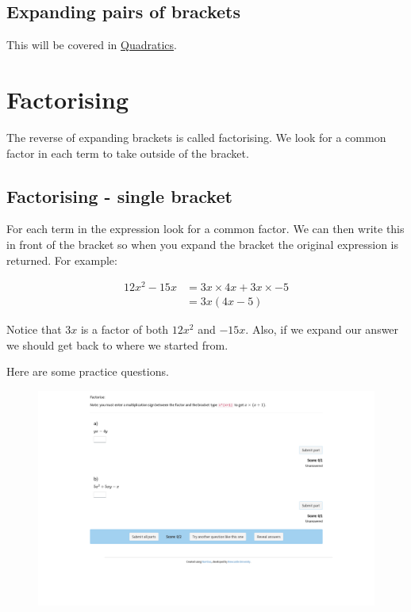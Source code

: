 \documentclass[
  a4paper,
]{scrbook}
\begin{document}
\hypertarget{expanding-pairs-of-brackets}{%
\subsection{Expanding pairs of
brackets}\label{expanding-pairs-of-brackets}}

This will be covered in \protect\hyperlink{quadratics-1}{Quadratics}.

\hypertarget{factorising}{%
\section{Factorising}\label{factorising}}

The reverse of expanding brackets is called factorising. We look for a
common factor in each term to take outside of the bracket.

\hypertarget{factorising---single-bracket}{%
\subsection{Factorising - single
bracket}\label{factorising---single-bracket}}

For each term in the expression look for a common factor. We can then
write this in front of the bracket so when you expand the bracket the
original expression is returned. For example:

\[
\begin{aligned} 12x^2 - 15x &= 3x \times 4x + 3x \times -5 \\
&= 3x(4x-5)
\end{aligned}
\]

Notice that \(3x\) is a factor of both \(12x^2\) and \(-15x\). Also, if
we expand our answer we should get back to where we started from.

Here are some practice questions.

\begin{figure}

{\centering 

\href{https://numbas.mathcentre.ac.uk/question/127099/algebra-factorising-single-brackets/embed/?token=29498934-17cf-45ab-96cb-ab4a6d7523ed}{\includegraphics{./03-expressions_with_brackets_files/figure-pdf/unnamed-chunk-2-1.png}}

}

\end{figure}
\end{document}
